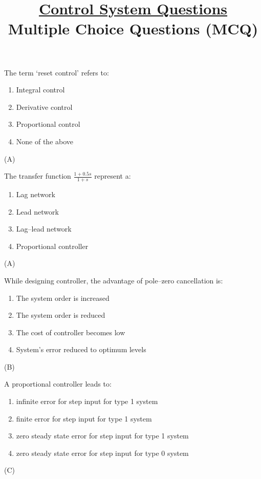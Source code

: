 \documentclass[a4paper]{exam}
\author{}
\title{\underline{\textbf{Control System Questions}}\\Multiple Choice Questions (MCQ)  \\  }
\begin{document}
\maketitle

\begin{questions}
\question
The term ‘reset control’ refers to:
\begin{enumerate}[label=(\Alph*)]
\item Integral control
\item Derivative control
\item Proportional control
\item None of the above
\end{enumerate}
\begin{solution}
(A)
\end{solution}

\question
The transfer function $\displaystyle\frac{1+0.5s}{1+s}$ represent a:
\begin{enumerate}[label=(\Alph*)]
\item Lag network
\item Lead network
\item Lag–lead network
\item Proportional controller
\end{enumerate}
\begin{solution}
(A)
\end{solution}

\question
While designing controller, the advantage of pole–zero cancellation is:
\begin{enumerate}[label=(\Alph*)]
\item The system order is increased
\item The system order is reduced
\item The cost of controller becomes low
\item System’s error reduced to optimum levels
\end{enumerate}
\begin{solution}
(B)
\end{solution}

\question
A proportional controller leads to:
\begin{enumerate}[label=(\Alph*)]
\item infinite error for step input for type 1 system
\item finite error for step input for type 1 system
\item zero steady state error for step input for type 1 system
\item zero steady state error for step input for type 0 system
\end{enumerate}
\begin{solution}
(C)
\end{solution}


\end{questions}
\end{document}
